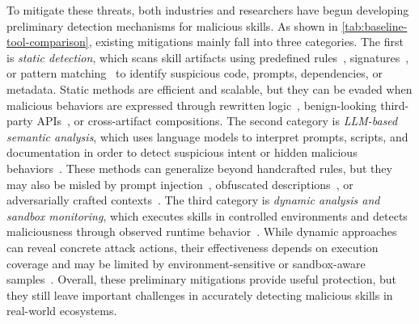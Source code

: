 To mitigate these threats, both industries and researchers have begun developing preliminary detection mechanisms for malicious skills. As shown in \autoref{tab:baseline-tool-comparison}, existing mitigations mainly fall into three categories. The first is \emph{static detection}, which scans skill artifacts using predefined rules~\cite{huifer-skill-security-scan,goplus-agentguard,roccia2026novaproximity,cisco-skill-scanner}, signatures~\cite{snyk-agent-scan}, or pattern matching~\cite{liu2026maliciousagentskillswild,cisco-skill-scanner,alice2026caterpillar} to identify suspicious code, prompts, dependencies, or metadata. Static methods are efficient and scalable, but they can be evaded when malicious behaviors are expressed through rewritten logic~\cite{certik-skill-scanning-boundary}, benign-looking third-party APIs~\cite{huang2024spiderscan}, or cross-artifact compositions. The second category is \emph{LLM-based semantic analysis}, which uses language models to interpret prompts, scripts, and documentation in order to detect suspicious intent or hidden malicious behaviors~\cite{liu2026maliciousagentskillswild,cisco-skill-scanner,alice2026caterpillar,roccia2026novaproximity}. These methods can generalize beyond handcrafted rules, but they may also be misled by prompt injection~\cite{checkpoint2025aievasion,melo2025aimalwarepromptinjection}, obfuscated descriptions~\cite{snyk-skill-scanner-false-security}, or adversarially crafted contexts~\cite{certik-skill-scanning-boundary,rao2026acoda}. The third category is \emph{dynamic analysis and sandbox monitoring}, which executes skills in controlled environments and detects maliciousness through observed runtime behavior~\cite{liu2026maliciousagentskillswild}. While dynamic approaches can reveal concrete attack actions, their effectiveness depends on execution coverage and may be limited by environment-sensitive or sandbox-aware samples~\cite{cyfirma-malware-evasion,lefaou2024antivirusedr}. Overall, these preliminary mitigations provide useful protection, but they still leave important challenges in accurately detecting malicious skills in real-world ecosystems.